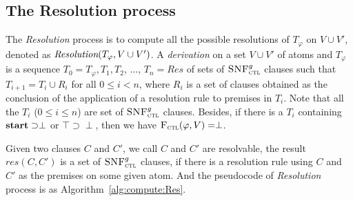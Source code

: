 \documentclass{article}
\begin{document}
\subsection{The Resolution process}
The \emph{Resolution} process is to compute all the possible resolutions of $T_{\varphi}$ on $V\cup V'$, denoted as $\emph{Resolution}(T_{\varphi}, V\cup V')$.
A \emph{derivation} on a set $V\cup V'$ of atoms and $T_{\varphi}$ is a sequence $T_0=T_{\varphi}, T_1, T_2$, $\dots$, $T_n=Res$ of sets of ${\textsc{SNF}_{\textsc{ctl}}^g}$ clauses such that $T_{i+1} = T_i \cup R_i$ for all $0\leq i < n$, where $R_i$ is a set of clauses obtained as the conclusion of the application of a resolution rule to premises in $T_i$.
Note that all the $T_i$ ($0 \leq i \leq n$) are set of ${\textsc{SNF}_{\textsc{ctl}}^g}$ clauses.
Besides, if there is a $T_i$ containing $\textbf{start}\supset \perp$ or $\top\supset \perp$, then we have ${\textsc{F}_{\textsc{ctl}}}(\varphi, V)=\perp$.

Given two clauses $C$ and $C'$, we call $C$ and $C'$ are resolvable, the result $res(C,C')$ is a set of ${\textsc{SNF}_{\textsc{ctl}}^g}$ clauses, if there is a resolution rule using $C$ and $C'$ as the premises on some given atom.
And the pseudocode of \emph{Resolution} process is as Algorithm~\ref{alg:compute:Res}.
\end{document}
